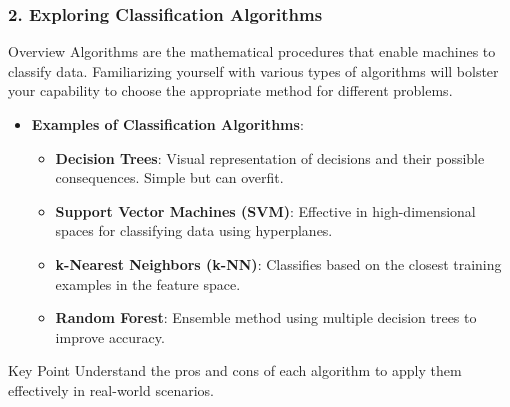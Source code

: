 \documentclass[aspectratio=169]{beamer}
\begin{document}
\begin{frame}[fragile]
    \frametitle{2. Exploring Classification Algorithms}
    \begin{block}{Overview}
        Algorithms are the mathematical procedures that enable machines to classify data. Familiarizing yourself with various types of algorithms will bolster your capability to choose the appropriate method for different problems.
    \end{block}
    
    \begin{itemize}
        \item \textbf{Examples of Classification Algorithms}:
        \begin{itemize}
            \item \textbf{Decision Trees}: Visual representation of decisions and their possible consequences. Simple but can overfit.
            \item \textbf{Support Vector Machines (SVM)}: Effective in high-dimensional spaces for classifying data using hyperplanes.
            \item \textbf{k-Nearest Neighbors (k-NN)}: Classifies based on the closest training examples in the feature space.
            \item \textbf{Random Forest}: Ensemble method using multiple decision trees to improve accuracy.
        \end{itemize}
    \end{itemize}

    \begin{block}{Key Point}
        Understand the pros and cons of each algorithm to apply them effectively in real-world scenarios.
    \end{block}
\end{frame}
\end{document}
